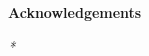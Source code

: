 \thispagestyle{empty}

\begin{center}
  {\bf \Huge Acknowledgements}
\end{center}

\vspace{4cm}


\emph{
  *
}
